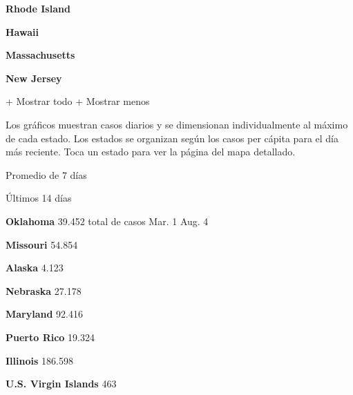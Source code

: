 \textbf{Rhode Island}

\href{https://www.nytimes.com/interactive/2020/us/hawaii-coronavirus-cases.html}{}

\textbf{Hawaii}

\href{https://www.nytimes.com/interactive/2020/us/massachusetts-coronavirus-cases.html}{}

\textbf{Massachusetts}

\href{https://www.nytimes.com/interactive/2020/us/new-jersey-coronavirus-cases.html}{}

\textbf{New Jersey}

+ Mostrar todo + Mostrar menos

Los gráficos muestran casos diarios y se dimensionan individualmente al
máximo de cada estado. Los estados se organizan según los casos per
cápita para el día más reciente. Toca un estado para ver la página del
mapa detallado.

\href{https://www.nytimes.com/interactive/2020/us/oklahoma-coronavirus-cases.html}{}

Promedio de 7 días

Últimos 14 días

\textbf{Oklahoma} 39.452 total de casos Mar. 1 Aug. 4

\href{https://www.nytimes.com/interactive/2020/us/missouri-coronavirus-cases.html}{}

\textbf{Missouri} 54.854

\href{https://www.nytimes.com/interactive/2020/us/alaska-coronavirus-cases.html}{}

\textbf{Alaska} 4.123

\href{https://www.nytimes.com/interactive/2020/us/nebraska-coronavirus-cases.html}{}

\textbf{Nebraska} 27.178

\href{https://www.nytimes.com/interactive/2020/us/maryland-coronavirus-cases.html}{}

\textbf{Maryland} 92.416

\href{https://www.nytimes.com/interactive/2020/us/puerto-rico-coronavirus-cases.html}{}

\textbf{Puerto Rico} 19.324

\href{https://www.nytimes.com/interactive/2020/us/illinois-coronavirus-cases.html}{}

\textbf{Illinois} 186.598

\textbf{U.S. Virgin Islands} 463

\href{https://www.nytimes.com/interactive/2020/us/montana-coronavirus-cases.html}{}

